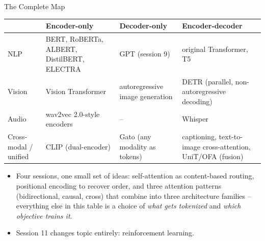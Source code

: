 \begin{vbframe}{The Complete Map}
\begin{center}
\footnotesize
\begin{tabular}{@{}p{1.7cm}p{3.0cm}p{2.6cm}p{3.4cm}@{}}
\toprule
 & \textbf{Encoder-only} & \textbf{Decoder-only} & \textbf{Encoder-decoder} \\
\midrule
NLP & BERT, RoBERTa, ALBERT, DistilBERT, ELECTRA & GPT (session 9) & original Transformer, T5 \\[4pt]
Vision & Vision Transformer & autoregressive image generation & DETR (parallel, non-autoregressive decoding) \\[4pt]
Audio & wav2vec 2.0-style encoders & -- & Whisper \\[4pt]
Cross-modal / unified & CLIP (dual-encoder) & Gato (any modality as tokens) & captioning, text-to-image cross-attention, UniT/OFA (fusion) \\
\bottomrule
\end{tabular}
\end{center}
\begin{itemize}
  \item Four sessions, one small set of ideas: self-attention as content-based routing, positional encoding to recover order, and three attention patterns (bidirectional, causal, cross) that combine into three architecture families -- everything else in this table is a choice of \emph{what gets tokenized} and \emph{which objective trains it}.
  \item Session 11 changes topic entirely: reinforcement learning.
\end{itemize}
\end{vbframe}

